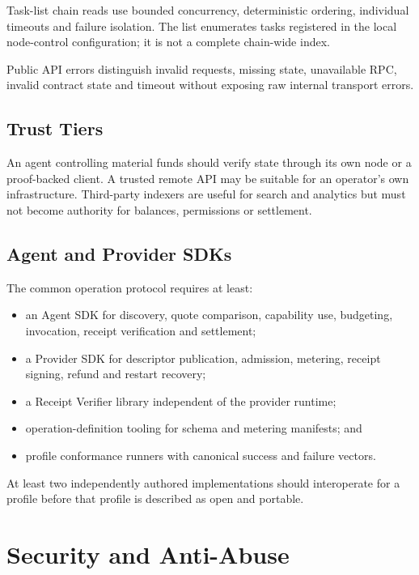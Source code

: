 \documentclass[11pt,oneside]{article}
\begin{document}
Task-list chain reads use bounded concurrency, deterministic ordering, individual timeouts and
failure isolation. The list enumerates tasks registered in the local node-control
configuration; it is not a complete chain-wide index.

Public API errors distinguish invalid requests, missing state, unavailable RPC, invalid
contract state and timeout without exposing raw internal transport errors.

\subsection{Trust Tiers}

An agent controlling material funds should verify state through its own node or a proof-backed
client. A trusted remote API may be suitable for an operator's own infrastructure. Third-party
indexers are useful for search and analytics but must not become authority for balances,
permissions or settlement.


\subsection{Agent and Provider SDKs}

The common operation protocol requires at least:

\begin{itemize}
  \item an Agent SDK for discovery, quote comparison, capability use, budgeting, invocation,
        receipt verification and settlement;
  \item a Provider SDK for descriptor publication, admission, metering, receipt signing,
        refund and restart recovery;
  \item a Receipt Verifier library independent of the provider runtime;
  \item operation-definition tooling for schema and metering manifests; and
  \item profile conformance runners with canonical success and failure vectors.
\end{itemize}

At least two independently authored implementations should interoperate for a profile before
that profile is described as open and portable.

\section{Security and Anti-Abuse}
\label{sec:anti-abuse}
\end{document}
